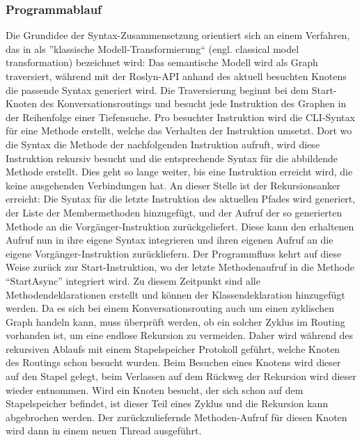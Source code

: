 \subsubsection{Programmablauf}
\label{subsubsec:Programablauf}
Die Grundidee der Syntax-Zusammensetzung orientiert sich an einem Verfahren, das in \cite[S. 272f]{Voelter:13} als ''klassische Modell-Transformierung`` (engl. classical model transformation) bezeichnet wird: Das semantische Modell wird als Graph traversiert, während mit der Roslyn-API anhand des aktuell besuchten Knotens die passende Syntax generiert wird. Die Traversierung beginnt bei dem Start-Knoten des Konversationsroutings und besucht jede Instruktion des Graphen in der Reihenfolge einer Tiefensuche. Pro besuchter Instruktion wird die CLI-Syntax für eine Methode erstellt, welche das Verhalten der Instruktion umsetzt. Dort wo die Syntax die Methode der nachfolgenden Instruktion aufruft, wird diese Instruktion rekursiv besucht und die entsprechende Syntax für die abbildende Methode erstellt. Dies geht so lange weiter, bis eine Instruktion erreicht wird, die keine ausgehenden Verbindungen hat. An dieser Stelle ist der Rekursionsanker erreicht: Die Syntax für die letzte Instruktion des aktuellen Pfades wird generiert, der Liste der Membermethoden hinzugefügt, und der Aufruf der so generierten Methode an die Vorgänger-Instruktion zurückgeliefert. Diese kann den erhaltenen Aufruf nun in ihre eigene Syntax integrieren und ihren eigenen Aufruf an die eigene Vorgänger-Instruktion zurückliefern. Der Programmfluss kehrt auf diese Weise zurück zur Start-Instruktion, wo der letzte Methodenaufruf in die Methode ``StartAsync'' integriert wird. Zu diesem Zeitpunkt sind alle Methodendeklarationen erstellt und können der Klassendeklaration hinzugefügt werden. 
\newline
Da es sich bei einem Konversationsrouting auch um einen zyklischen Graph handeln kann, muss überprüft werden, ob ein solcher Zyklus im Routing vorhanden ist, um eine endlose Rekursion zu vermeiden. Daher wird während des rekursiven Ablaufs mit einem Stapelspeicher Protokoll geführt, welche Knoten des Routings schon besucht wurden. Beim Besuchen eines Knotens wird dieser auf den Stapel gelegt, beim Verlassen auf dem Rückweg der Rekursion wird dieser wieder entnommen. Wird ein Knoten besucht, der sich schon auf dem Stapelspeicher befindet, ist dieser Teil eines Zyklus und die Rekursion kann abgebrochen werden. Der zurückzuliefernde Methoden-Aufruf für diesen Knoten wird dann in einem neuen Thread ausgeführt. 
\newline
